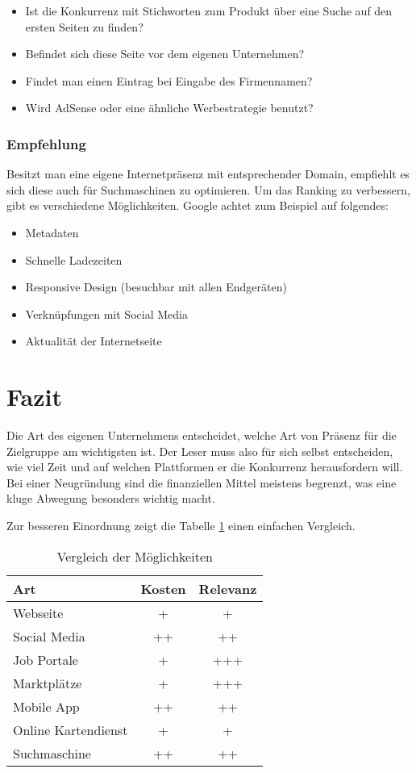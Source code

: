 \begin{itemize}
\item Ist die Konkurrenz mit Stichworten zum Produkt über eine Suche auf den ersten Seiten zu finden?
\item Befindet sich diese Seite vor dem eigenen Unternehmen?
\item Findet man einen Eintrag bei Eingabe des Firmennamen?
\item Wird AdSense oder eine ähnliche Werbestrategie benutzt? %
\end{itemize}

\subsubsection*{Empfehlung}
Besitzt man eine eigene Internetpräsenz mit entsprechender Domain, empfiehlt es sich diese auch für Suchmaschinen zu optimieren. Um das Ranking zu verbessern, gibt es verschiedene Möglichkeiten. Google achtet zum Beispiel auf folgendes:
\begin{itemize}
\item Metadaten
\item Schnelle Ladezeiten
\item Responsive Design (besuchbar mit allen Endgeräten)
\item Verknüpfungen mit Social Media
\item Aktualität der Internetseite
\end{itemize}
\section{Fazit}

Die Art des eigenen Unternehmens entscheidet, welche Art von Präsenz für die Zielgruppe am wichtigsten ist. Der Leser muss also für sich selbst entscheiden, wie viel Zeit und auf welchen Plattformen er die Konkurrenz herausfordern will. Bei einer Neugründung sind die finanziellen Mittel meistens begrenzt, was eine kluge Abwegung besonders wichtig macht.

Zur besseren Einordnung zeigt die Tabelle \ref{tab:kosten} einen einfachen Vergleich.

\begin{table}[H]
\centering
\caption{Vergleich der Möglichkeiten}
\label{tab:kosten}
\begin{tabular}{ |l|c|c| }
\hline
Art & Kosten & Relevanz \\ \hline
Webseite & + & + \\ \hline
Social Media & ++ & ++ \\ \hline
Job Portale & + & +++ \\ \hline
Marktplätze & + & +++ \\ \hline
Mobile App & ++ & ++ \\ \hline
Online Kartendienst & + & + \\ \hline
Suchmaschine & ++ & ++ \\ \hline
\end{tabular}
\end{table}
